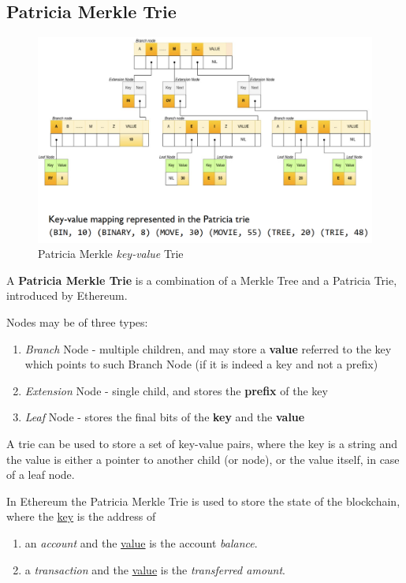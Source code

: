 \subsection{Patricia Merkle Trie}

\begin{figure}[htbp]
   \centering
   \includegraphics{images/patriciaMerkle.png}
   \caption{Patricia Merkle \textit{key-value} Trie}
   \label{fig:patriciaMerkle}
\end{figure}
A \textbf{Patricia Merkle Trie} is a combination of a Merkle Tree and a Patricia Trie, introduced by Ethereum.
{Nodes may be of three types:\ns
\begin{enumerate}
   \item \textit{Branch} Node - multiple children, and may store a \textbf{value} referred to the key which points to such Branch Node (if it is indeed a key and not a prefix)
   \item \textit{Extension} Node - single child, and stores the \textbf{prefix} of the key
   \item \textit{Leaf} Node - stores the final bits of the \textbf{key} and the \textbf{value}
\end{enumerate}
}

A trie can be used to store a set of key-value pairs, where the key is a string and the value is either a pointer to another child (or node), or the value itself, in case of a leaf node.

{In Ethereum the Patricia Merkle Trie is used to store the state of the blockchain, where the \ul{key} is the address of \ns
\begin{enumerate}
   \item an \textit{account} and the \ul{value} is the account \textit{balance}.
   \item a \textit{transaction} and the \ul{value} is the \textit{transferred amount}.
\end{enumerate}}

